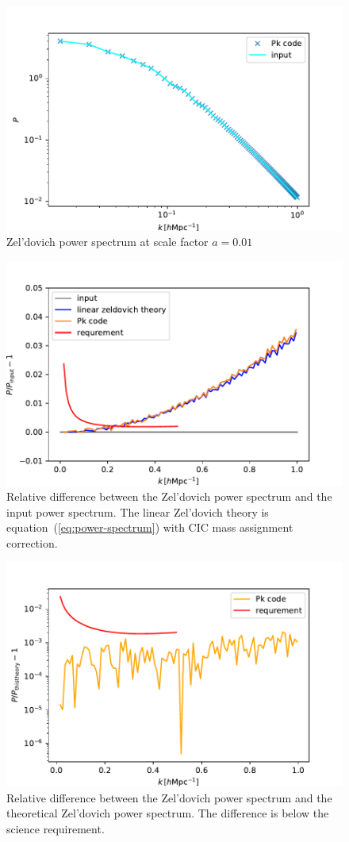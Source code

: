 \documentclass[a4paper,11pt]{article}
\begin{document}
\begin{figure}
  \centering
  \includegraphics{zeldovich_linear1.pdf}
  \caption{Zel'dovich power spectrum at scale factor $a=0.01$}
\end{figure}

\begin{figure}
  \centering
  \includegraphics{zeldovich_linear2.pdf}
  \caption{Relative difference between the Zel'dovich power spectrum
    and the input power spectrum. The linear Zel'dovich theory is
    equation~(\ref{eq:power-spectrum}) with CIC mass assignment
    correction.}
\end{figure}

\begin{figure}
  \centering
  \includegraphics{zeldovich_linear3.pdf}
  \caption{Relative difference between the Zel'dovich power spectrum
    and the theoretical Zel'dovich power spectrum. The difference is
    below the science requirement.}
\end{figure}

\label{LastPage}
\end{document}
